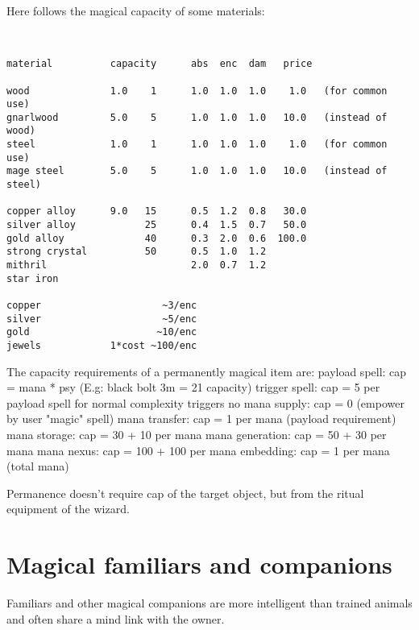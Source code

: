 Here follows the magical capacity of some materials:

\

\small \begin{verbatim}
material          capacity      abs  enc  dam   price

wood              1.0    1      1.0  1.0  1.0    1.0   (for common use)
gnarlwood         5.0    5      1.0  1.0  1.0   10.0   (instead of wood)
steel             1.0    1      1.0  1.0  1.0    1.0   (for common use)
mage steel        5.0    5      1.0  1.0  1.0   10.0   (instead of steel)

copper alloy      9.0   15      0.5  1.2  0.8   30.0
silver alloy            25      0.4  1.5  0.7   50.0
gold alloy              40      0.3  2.0  0.6  100.0
strong crystal          50      0.5  1.0  1.2
mithril                         2.0  0.7  1.2
star iron

copper                     ~3/enc
silver                     ~5/enc
gold                      ~10/enc
jewels            1*cost ~100/enc

\end{verbatim} \normalsize

The capacity requirements of a permanently magical item are:
payload spell: cap = mana * psy (E.g: black bolt 3m = 21 capacity)
trigger spell: cap = 5 per payload spell for normal complexity triggers
no mana supply: cap = 0 (empower by user "magic" spell)
mana transfer: cap = 1 per mana (payload requirement)
mana storage: cap = 30 + 10 per mana
mana generation: cap = 50 + 30 per mana
mana nexus: cap = 100 + 100 per mana
embedding: cap = 1 per mana (total mana)

Permanence doesn't require cap of the target object, but from the ritual equipment of the wizard.







\section*{Magical familiars and companions}

Familiars and other magical companions are more intelligent than trained animals and often share a mind link with the owner.





